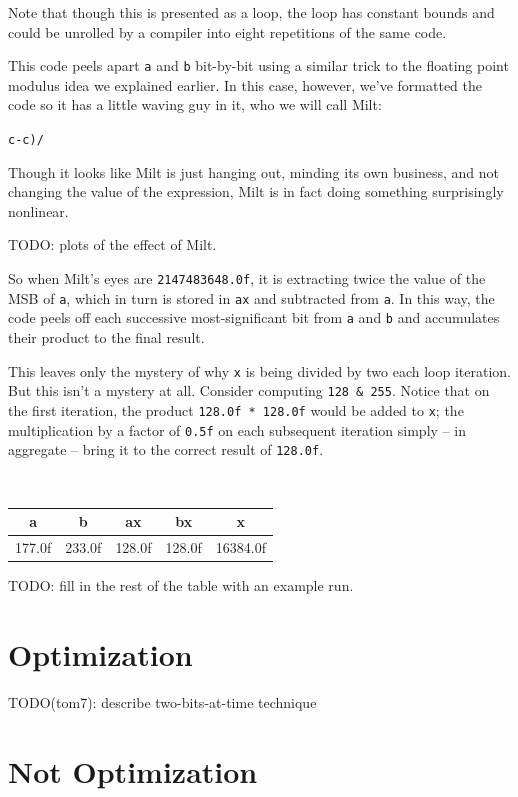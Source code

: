 \documentclass{acmsiggraph}
\theoremstyle{remark}
\theoremstyle{definition}
\begin{document}
Note that though this is presented as a loop, the loop has constant bounds and could be unrolled by a compiler into eight repetitions of the same code.

This code peels apart {\tt a} and {\tt b} bit-by-bit using a similar trick to the floating point modulus idea we explained earlier.
In this case, however, we've formatted the code so it has a little waving guy in it, who we will call Milt:

\begin{center}
\huge
{\tt c-c)/}
\end{center}

Though it looks like Milt is just hanging out, minding its own business, and not changing the value of the expression,
Milt is in fact doing something surprisingly nonlinear.

TODO: plots of the effect of Milt.

So when Milt's eyes are {\tt 2147483648.0f}, it is extracting twice the value of the MSB of {\tt a},
which in turn is stored in {\tt ax} and subtracted from {\tt a}.
In this way, the code peels off each successive most-significant bit from {\tt a} and {\tt b} and accumulates their product to the final result.

This leaves only the mystery of why {\tt x} is being divided by two each loop iteration.
But this isn't a mystery at all.
Consider computing {\tt 128 \& 255}.
Notice that on the first iteration, the product {\tt 128.0f * 128.0f} would be added to {\tt x};
the multiplication by a factor of {\tt 0.5f} on each subsequent iteration simply -- in aggregate -- bring it to the correct result of {\tt 128.0f}.

{ \tt
\begin{tabular}{r|r|r|r|r}
\multicolumn{1}{c|}{a} &
\multicolumn{1}{c|}{b} &
\multicolumn{1}{c|}{ax} &
\multicolumn{1}{c|}{bx} &
\multicolumn{1}{c}{x} \\\hline
177.0f & 233.0f & 128.0f & 128.0f & 16384.0f \\
\end{tabular}
}

TODO: fill in the rest of the table with an example run.

\section{Optimization}

TODO(tom7): describe two-bits-at-time technique

\section{Not Optimization}
\end{document}
